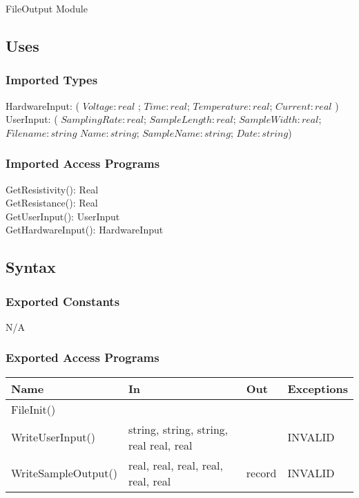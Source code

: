 \documentclass[12pt, titlepage]{article}
\begin{document}
FileOutput Module

\subsection{Uses}

\subsubsection{Imported Types}

HardwareInput: ( $Voltage: real $ ; $Time: real$; $Temperature: real$; $Current: real$ )\\
UserInput: ( $SamplingRate: real$; $SampleLength: real$; $SampleWidth: real$; $Filename: string$ $Name: string$; $SampleName: string$; $Date: string$)

\subsubsection{Imported Access Programs}
  GetResistivity(): Real\\
  GetResistance(): Real\\
  GetUserInput(): UserInput\\
  GetHardwareInput(): HardwareInput

\subsection{Syntax}

\subsubsection{Exported Constants}

N/A

\subsubsection{Exported Access Programs}

\begin{center}
\begin{tabular}{p{4cm} p{6cm} p{2cm} p{3cm}}
\hline
\textbf{Name} & \textbf{In} & \textbf{Out} & \textbf{Exceptions} \\
\hline
FileInit() & &  &  \\
WriteUserInput() & string, string, string, real real, real&  & INVALID \\
WriteSampleOutput()& real, real, real, real, real, real & record & INVALID \\

\hline
\end{tabular}
\end{center}
\end{document}
